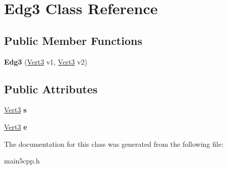 \hypertarget{class_edg3}{}\section{Edg3 Class Reference}
\label{class_edg3}
\subsection*{Public Member Functions}
\begin{DoxyCompactItemize}
\item 
\mbox{\label{class_edg3_a97ef4425690e064ad10ed13e179a2874}} 
{\bfseries Edg3} (\mbox{\hyperlink{class_vert3}{Vert3}} v1, \mbox{\hyperlink{class_vert3}{Vert3}} v2)
\end{DoxyCompactItemize}
\subsection*{Public Attributes}
\begin{DoxyCompactItemize}
\item 
\mbox{\label{class_edg3_a1f391c8ccb863a19bd143d31493db77a}} 
\mbox{\hyperlink{class_vert3}{Vert3}} {\bfseries s}
\item 
\mbox{\label{class_edg3_a090172b8938032a52b12875768395faa}} 
\mbox{\hyperlink{class_vert3}{Vert3}} {\bfseries e}
\end{DoxyCompactItemize}


The documentation for this class was generated from the following file\+:\begin{DoxyCompactItemize}
\item 
main5cpp.\+h\end{DoxyCompactItemize}
